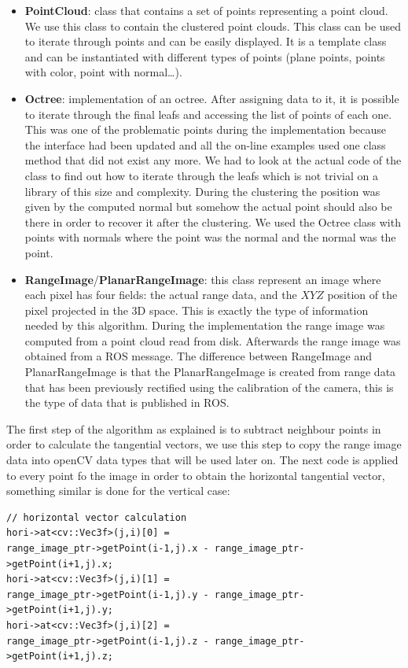\documentclass[fontsize=12pt]{article}
\begin{document}
\begin{itemize}
    \item \textbf{PointCloud}: class that contains a set of points representing a point cloud. We use this class to contain the clustered point clouds. This class can be used to iterate through points and can be easily displayed. It is a template class and can be instantiated with different types of points (plane points, points with color, point with normal\ldots).
    \item \textbf{Octree}: implementation of an octree. After assigning data to it, it is possible to iterate through the final leafs and accessing the list of points of each  one. This was one of the problematic points during the implementation because the interface had been updated and all the on-line examples used one class method that did not exist any more. We had to look at the actual code of the class to find out how to iterate through the leafs which is not trivial on a library of this size and complexity. During the clustering the position was given by the computed normal but somehow the actual point should also be there in order to recover it after the clustering. We used the Octree class with points with normals where the point was the normal and the normal was the point.
    \item \textbf{RangeImage}/\textbf{PlanarRangeImage}: this class represent an image where each pixel has four fields: the actual range data, and the $XYZ$ position of the pixel projected in the 3D space. This is exactly  the type of information needed by this algorithm. During the implementation the range image was computed from a point cloud read from disk. Afterwards the range image was obtained from a ROS message. The difference between RangeImage and PlanarRangeImage is that the PlanarRangeImage is created from range data that has been previously rectified using the calibration of the camera, this is the type of data that is published in ROS.
\end{itemize}

The first step of the algorithm as explained is to subtract neighbour points in order to calculate the tangential vectors, we use this step to copy the range image data into openCV data types that will be used later on. The next code is applied to every point fo the image in order to obtain the horizontal tangential vector, something similar is done for the vertical case:\\

\begin{lstlisting}
// horizontal vector calculation
hori->at<cv::Vec3f>(j,i)[0] = 
range_image_ptr->getPoint(i-1,j).x - range_image_ptr->getPoint(i+1,j).x;
hori->at<cv::Vec3f>(j,i)[1] = 
range_image_ptr->getPoint(i-1,j).y - range_image_ptr->getPoint(i+1,j).y;
hori->at<cv::Vec3f>(j,i)[2] =
range_image_ptr->getPoint(i-1,j).z - range_image_ptr->getPoint(i+1,j).z;
\end{lstlisting}
\end{document}
